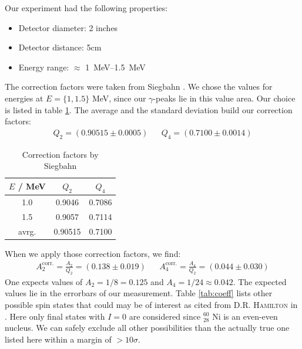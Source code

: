 \documentclass[11pt,a4paper,notitlepage]{scrartcl}
\begin{document}
Our experiment had the following properties:
\begin{itemize}
	\item Detector diameter: 2 inches
	\item Detector distance: 5cm
	\item Energy range: $\approx$ \SIrange{1}{1.5}{\mega\eV}
\end{itemize}
The correction factors were taken from Siegbahn \cite{siegbahn}. We chose the values for energies at $E=\{1,1.5\}$ MeV, since our $\gamma$-peaks lie in this value area. Our choice is listed in table \ref{tab:correction_factors}. The average and the standard deviation build our correction factors:
\begin{align*}
	Q_2=(0.90515\pm0.0005) && Q_4=(0.7100\pm0.0014)
\end{align*}

\begin{table}
	\centering
	\begin{tabular}{|c|c|c|}
		\hline
		$E$ / MeV& $Q_2$ & $Q_4$ \\
		\hline
		1.0& 0.9046 & 0.7086 \\
		1.5& 0.9057 & 0.7114\\
		avrg. &0.90515& 0.7100\\
		\hline
	\end{tabular}
	\caption{Correction factors by Siegbahn \cite{siegbahn}}\label{tab:correction_factors}
\end{table}
When we apply those correction factors, we find:
\begin{align*}
	A_2^{\text{corr.}}=\frac{A_2}{Q_2}=(0.138\pm0.019) && A_4^{\text{corr.}}=\frac{A_4}{Q_2}=(0.044\pm0.030)
\end{align*}
One expects values of $A_2=1/8=0.125$ and $A_4=1/24\approx 0.042$. The expected values lie in the errorbars of our measurement. Table \ref{tab:coeff} lists other possible spin states that could may be of interest as cited from \textsc{D.R. Hamilton} \cite{hamilton} in \cite{bdpaper}. Here only final states with $I=0$ are considered since $^{60}_{28}$ Ni is an even-even nucleus. We can safely exclude all other possibilities than the actually true one listed here within a margin of $>10\sigma$.
\end{document}
